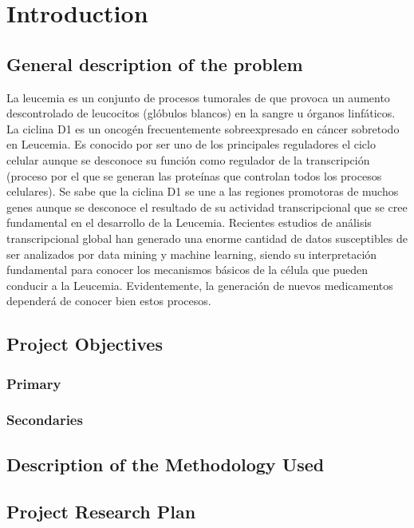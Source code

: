 \chapter{Introduction}
\label{chapter:introduction}


\section{General description of the problem}

La leucemia es un conjunto de procesos tumorales de que provoca un aumento descontrolado de leucocitos (glóbulos blancos) en la sangre u órganos linfáticos. La ciclina D1 es un oncogén frecuentemente sobreexpresado en cáncer sobretodo en Leucemia. Es conocido por ser uno de los principales reguladores el ciclo celular aunque se desconoce su función como regulador de la transcripción (proceso por el que se generan las proteínas que controlan todos los procesos celulares). Se sabe que la ciclina D1 se une a las regiones promotoras de muchos genes aunque se desconoce el resultado de su actividad transcripcional que se cree fundamental en el desarrollo de la Leucemia. Recientes estudios de análisis transcripcional global han generado una enorme cantidad de datos susceptibles de ser analizados por data mining y machine learning, siendo su interpretación fundamental para conocer los mecanismos básicos de la célula que pueden conducir a la Leucemia. Evidentemente, la generación de nuevos medicamentos dependerá de conocer bien estos procesos.



\section{Project Objectives}
\subsection{Primary}
\subsection{Secondaries}
\section{Description of the Methodology Used}
\section{Project Research Plan}